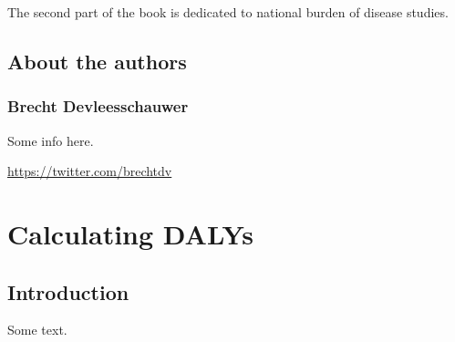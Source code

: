 \documentclass[
]{book}
\begin{document}
The second part of the book is dedicated to national burden of disease studies.

\hypertarget{about-the-authors}{%
\chapter*{About the authors}\label{about-the-authors}}

\hypertarget{brecht-devleesschauwer}{%
\section*{Brecht Devleesschauwer}\label{brecht-devleesschauwer}}

Some info here.

\url{https://twitter.com/brechtdv}

\hypertarget{part-calculating-dalys}{%
\part{Calculating DALYs}\label{part-calculating-dalys}}

\hypertarget{introduction}{%
\chapter{Introduction}\label{introduction}}

Some text.

  
\end{document}
